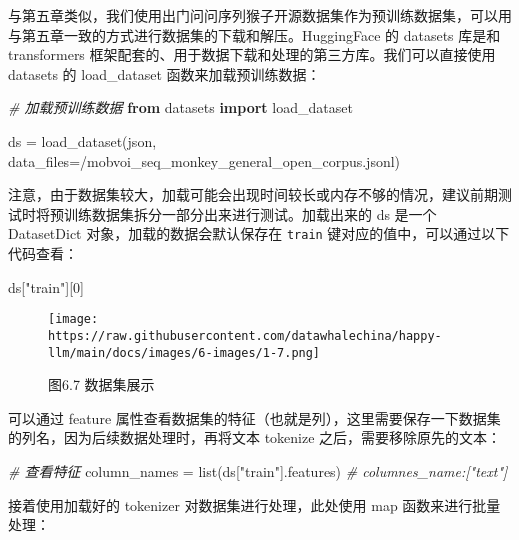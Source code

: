 \documentclass[
]{article}
\newenvironment{Shaded}{}{}
\newcommand{\BuiltInTok}[1]{\textcolor[rgb]{0.00,0.50,0.00}{#1}}
\newcommand{\CommentTok}[1]{\textcolor[rgb]{0.38,0.63,0.69}{\textit{#1}}}
\newcommand{\DecValTok}[1]{\textcolor[rgb]{0.25,0.63,0.44}{#1}}
\newcommand{\ImportTok}[1]{\textcolor[rgb]{0.00,0.50,0.00}{\textbf{#1}}}
\newcommand{\NormalTok}[1]{#1}
\newcommand{\OperatorTok}[1]{\textcolor[rgb]{0.40,0.40,0.40}{#1}}
\newcommand{\StringTok}[1]{\textcolor[rgb]{0.25,0.44,0.63}{#1}}
\begin{document}
与第五章类似，我们使用出门问问序列猴子开源数据集作为预训练数据集，可以用与第五章一致的方式进行数据集的下载和解压。HuggingFace
的 datasets 库是和 transformers
框架配套的、用于数据下载和处理的第三方库。我们可以直接使用 datasets 的
load\_dataset 函数来加载预训练数据：

\begin{Shaded}
\begin{Highlighting}[]
\CommentTok{\# 加载预训练数据}
\ImportTok{from}\NormalTok{ datasets }\ImportTok{import}\NormalTok{ load\_dataset}

\NormalTok{ds }\OperatorTok{=}\NormalTok{ load\_dataset(}\StringTok{\textquotesingle{}json\textquotesingle{}}\NormalTok{, data\_files}\OperatorTok{=}\StringTok{\textquotesingle{}/mobvoi\_seq\_monkey\_general\_open\_corpus.jsonl\textquotesingle{}}\NormalTok{)}
\end{Highlighting}
\end{Shaded}

注意，由于数据集较大，加载可能会出现时间较长或内存不够的情况，建议前期测试时将预训练数据集拆分一部分出来进行测试。加载出来的
ds 是一个 DatasetDict 对象，加载的数据会默认保存在 \texttt{train}
键对应的值中，可以通过以下代码查看：

\begin{Shaded}
\begin{Highlighting}[]
\NormalTok{ds[}\StringTok{"train"}\NormalTok{][}\DecValTok{0}\NormalTok{]}
\end{Highlighting}
\end{Shaded}

\begin{figure}[htbp]\centering
\texttt{[image: https://raw.githubusercontent.com/datawhalechina/happy-llm/main/docs/images/6-images/1-7.png]}
\caption{图6.7 数据集展示}
\end{figure}

可以通过 feature
属性查看数据集的特征（也就是列），这里需要保存一下数据集的列名，因为后续数据处理时，再将文本
tokenize 之后，需要移除原先的文本：

\begin{Shaded}
\begin{Highlighting}[]
\CommentTok{\# 查看特征}
\NormalTok{column\_names }\OperatorTok{=} \BuiltInTok{list}\NormalTok{(ds[}\StringTok{"train"}\NormalTok{].features)}
\CommentTok{\# columnes\_name:["text"]}
\end{Highlighting}
\end{Shaded}

接着使用加载好的 tokenizer 对数据集进行处理，此处使用 map
函数来进行批量处理：
\end{document}
